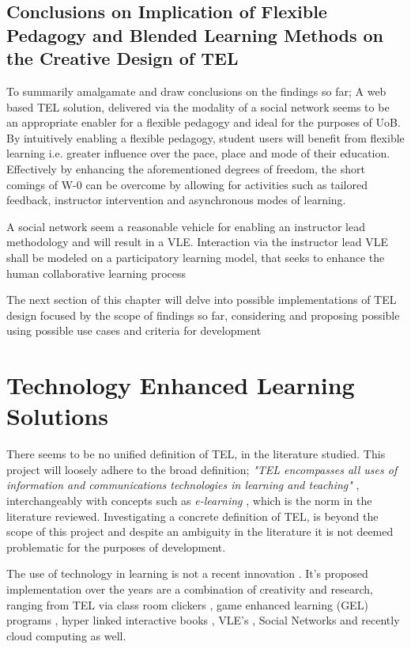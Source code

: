 \subsection{Conclusions on Implication of Flexible Pedagogy and Blended Learning Methods on the Creative Design of TEL}
\label{subsec:subsec01}

To summarily amalgamate and draw conclusions on the findings so far; A  web based TEL solution, delivered via the modality of a social network seems to be an  appropriate enabler for a flexible pedagogy and ideal for the purposes of UoB. By intuitively enabling a flexible pedagogy, student users will benefit from flexible learning i.e. greater influence over the pace, place and mode of their education. Effectively by enhancing the aforementioned degrees of freedom, the short comings of W-0 can be overcome by allowing for activities such as tailored feedback, instructor intervention and asynchronous modes of learning.

A social network seem a reasonable vehicle for enabling an instructor lead methodology and will result in a VLE. Interaction via the instructor lead VLE shall be modeled on a participatory learning model, that seeks to enhance the human collaborative learning process \cite{Yager1990,Yager2004}

The next section of this chapter will delve into possible implementations of TEL design focused by the scope of findings so far, considering and proposing possible using possible use cases and criteria for development

\section{Technology Enhanced Learning Solutions}
\label{sec:sec01}

There seems to be no unified definition of TEL, in the literature studied. This project will loosely adhere to the broad definition; \textit { "TEL encompasses all uses of information and communications technologies in learning and teaching"} \cite{Project2009}, interchangeably with concepts such as \textit{e-learning} \cite{Gordon2014}, which is the norm in the literature reviewed. Investigating a concrete definition of TEL, is beyond the scope of this project and despite an ambiguity in the literature it is not deemed problematic for the purposes of development. 

The use of technology in learning is not a recent innovation \cite{Serrano-Laguna2015,TechFacultyinnovate.utexas.edu,Harger1996}. It's proposed implementation over the years are a combination of creativity and research, ranging from TEL via class room clickers \cite{Hatziapostolou2014},  game enhanced learning (GEL) programs \cite{Serrano-Laguna2015,Ibanez2014}, hyper linked interactive books  \cite{Harger1996}, VLE's \cite{Gordon2014,Richmond2005,Burge2011}, Social Networks \cite{Burge2011,Cubukcuo2012} and recently cloud computing \cite{Burge2011} as well.

